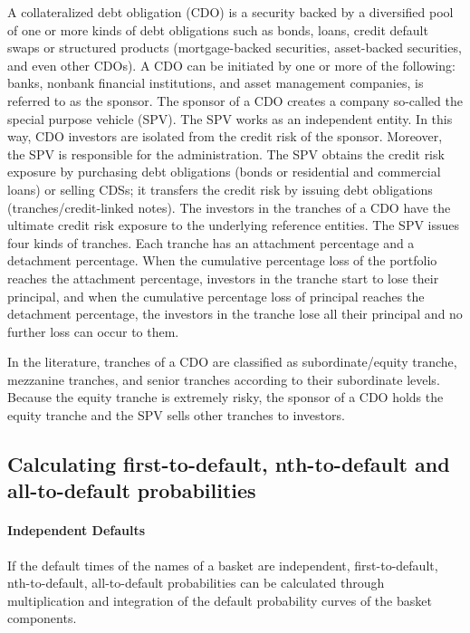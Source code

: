 A collateralized debt obligation (CDO) is a security backed by a
diversified pool of one or more kinds of debt obligations such as bonds,
loans, credit default swaps or structured products (mortgage-backed
securities, asset-backed securities, and even other CDOs). A CDO can be
initiated by one or more of the following: banks, nonbank financial
institutions, and asset management companies, is referred to as the
sponsor. The sponsor of a CDO creates a company so-called the special
purpose vehicle (SPV). The SPV works as an independent entity. In this
way, CDO investors are isolated from the credit risk of the sponsor.
Moreover, the SPV is responsible for the administration. The SPV obtains
the credit risk exposure by purchasing debt obligations (bonds or
residential and commercial loans) or selling CDSs; it transfers the
credit risk by issuing debt obligations (tranches/credit-linked notes).
The investors in the tranches of a CDO have the ultimate credit risk
exposure to the underlying reference entities. The SPV issues four kinds
of tranches. Each tranche has an attachment percentage and a detachment
percentage. When the cumulative percentage loss of the portfolio reaches
the attachment percentage, investors in the tranche start to lose their
principal, and when the cumulative percentage loss of principal reaches
the detachment percentage, the investors in the tranche lose all their
principal and no further loss can occur to them.

In the literature, tranches of a CDO are classified as
subordinate/equity tranche, mezzanine tranches, and senior tranches
according to their subordinate levels. Because the equity tranche is
extremely risky, the sponsor of a CDO holds the equity tranche and the
SPV sells other tranches to investors.

\subsection{Calculating first-to-default, nth-to-default and
all-to-default
probabilities}\label{calculating-first-to-default-nth-to-default-and-all-to-default-probabilities}

\paragraph{Independent Defaults}\label{independent-defaults}

If the default times of the names of a basket are independent,
first-to-default, nth-to-default, all-to-default probabilities can be
calculated through multiplication and integration of the default
probability curves of the basket components.

